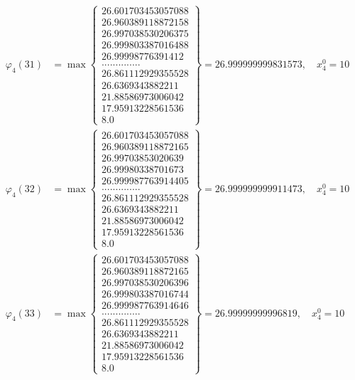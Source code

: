 \documentclass{article}
\begin{document}
\begin{align*}
  
  
  
\varphi_{4}(31) &= \max \left\{ \begin{array}{c}
26.601703453057088 \\
 26.960389118872158 \\
 26.997038530206375 \\
 26.999803387016488 \\
 26.99998776391412 \\
 .............. \\
 26.861112929355528 \\
 26.6369343882211 \\
 21.88586973006042 \\
 17.95913228561536 \\
 8.0
\end{array} \right\} = 26.999999999831573, \quad x_{4}^0 = 10\\
  
  
  
  
\varphi_{4}(32) &= \max \left\{ \begin{array}{c}
26.601703453057088 \\
 26.960389118872165 \\
 26.99703853020639 \\
 26.99980338701673 \\
 26.999987763914405 \\
 .............. \\
 26.861112929355528 \\
 26.6369343882211 \\
 21.88586973006042 \\
 17.95913228561536 \\
 8.0
\end{array} \right\} = 26.999999999911473, \quad x_{4}^0 = 10\\
  
  
  
  
\varphi_{4}(33) &= \max \left\{ \begin{array}{c}
26.601703453057088 \\
 26.960389118872165 \\
 26.997038530206396 \\
 26.999803387016744 \\
 26.999987763914646 \\
 .............. \\
 26.861112929355528 \\
 26.6369343882211 \\
 21.88586973006042 \\
 17.95913228561536 \\
 8.0
\end{array} \right\} = 26.99999999996819, \quad x_{4}^0 = 10\\
  

\end{align*}
\end{document}
